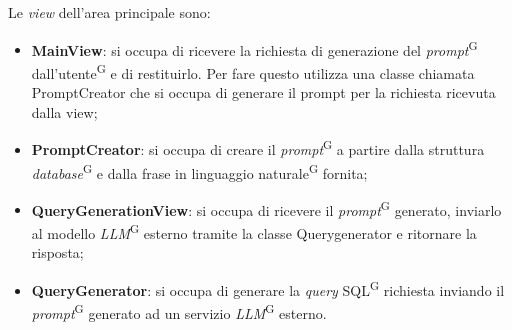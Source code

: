 \documentclass[5pt]{article}
\begin{document}
	Le \textit{view} dell'area principale sono:
	\begin{itemize}
		\item  \textbf{MainView}: si occupa di ricevere la richiesta di generazione del \textit{prompt}\textsuperscript{G} dall'utente\textsuperscript{G} e di restituirlo. Per fare questo utilizza una classe chiamata PromptCreator che si occupa di generare il prompt per la richiesta ricevuta dalla view;
		\item \textbf{PromptCreator}: si occupa di creare il \textit{prompt}\textsuperscript{G} a partire dalla struttura \textit{database}\textsuperscript{G} e dalla frase in linguaggio naturale\textsuperscript{G} fornita;
		\item \textbf{QueryGenerationView}: si occupa di ricevere il \textit{prompt}\textsuperscript{G} generato, inviarlo al modello \textit{LLM}\textsuperscript{G} esterno tramite la classe Querygenerator e ritornare la risposta;
		\item \textbf{QueryGenerator}: si occupa di generare la \textit{query} SQL\textsuperscript{G} richiesta inviando il \textit{prompt}\textsuperscript{G} generato ad un servizio \textit{LLM}\textsuperscript{G} esterno.
	\end{itemize}
\end{document}
